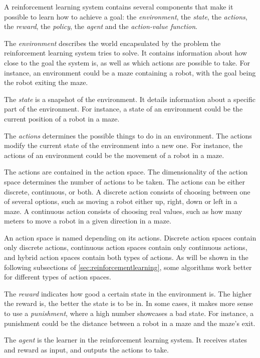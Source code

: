 \documentclass{kththesis}
\begin{document}
A reinforcement learning system contains several components that make it possible to learn how to achieve a goal: the \textit{environment}, the \textit{state}, the \textit{actions}, the \textit{reward}, the \textit{policy}, the \textit{agent} and the \textit{action-value function}.

The \textit{environment} describes the world encapsulated by the problem the reinforcement learning system tries to solve. It contains information about how close to the goal the system is, as well as which actions are possible to take. For instance, an environment could be a maze containing a robot, with the goal being the robot exiting the maze.

The \textit{state} is a snapshot of the environment. It details information about a specific part of the environment. For instance, a state of an environment could be the current position of a robot in a maze.

The \textit{actions} determines the possible things to do in an environment. The actions modify the current state of the environment into a new one. For instance, the actions of an environment could be the movement of a robot in a maze. 

The actions are contained in the action space. The dimensionality of the action space determines the number of actions to be taken. The actions can be either discrete, continuous, or both. A discrete action consists of choosing between one of several options, such as moving a robot either up, right, down or left in a maze. A continuous action consists of choosing real values, such as how many meters to move a robot in a given direction in a maze.

An action space is named depending on its actions. Discrete action spaces contain only discrete actions, continuous action spaces contain only continuous actions, and hybrid action spaces contain both types of actions. As will be shown in the following subsections of \autoref{sec:reinforcementlearning}, some algorithms work better for different types of action spaces.

The \textit{reward} indicates how good a certain state in the environment is. The higher the reward is, the better the state is to be in. In some cases, it makes more sense to use a \textit{punishment}, where a high number showcases a bad state. For instance, a punishment could be the distance between a robot in a maze and the maze's exit. 

The \textit{agent} is the learner in the reinforcement learning system. It receives states and reward as input, and outputs the actions to take.
\end{document}
